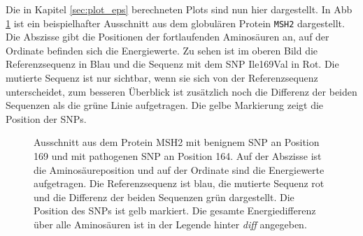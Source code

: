 Die in Kapitel \ref{sec:plot_eps} berechneten Plots sind nun hier dargestellt. In \ac{Abb} \ref{fig:comp_plot_MSH2} ist ein beispielhafter Ausschnitt aus dem globulären Protein \texttt{MSH2} dargestellt. Die Abszisse gibt die Positionen der fortlaufenden Aminosäuren an, auf der Ordinate befinden sich die Energiewerte. Zu sehen ist im oberen Bild die Referenzsequenz in Blau und die Sequenz mit dem \ac{SNP} Ile169Val in Rot. Die mutierte Sequenz ist nur sichtbar, wenn sie sich von der Referenzsequenz unterscheidet, zum besseren Überblick ist zusätzlich noch die Differenz der beiden Sequenzen als die grüne Linie aufgetragen. Die gelbe Markierung zeigt die Position der \ac{SNP}s. 
%
\begin{figure}
    \centering
    \caption{Ausschnitt aus dem Protein MSH2 mit benignem \ac{SNP} an Position 169 und mit pathogenen \ac{SNP} an Position 164. Auf der Abszisse ist die Aminosäureposition und auf der Ordinate sind die Energiewerte aufgetragen. Die Referenzsequenz ist blau, die mutierte Sequenz rot und die Differenz der beiden Sequenzen grün dargestellt. Die Position des \ac{SNP}s ist gelb markiert. Die gesamte Energiedifferenz über alle Aminosäuren ist in der Legende hinter \emph{diff} angegeben.} 
    \label{fig:comp_plot_MSH2}
\end{figure}
